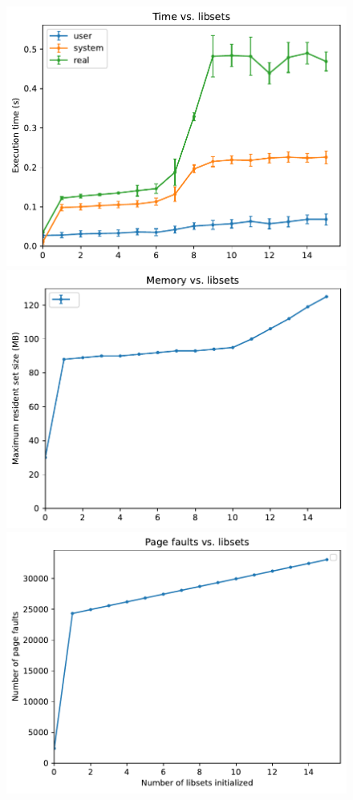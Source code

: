 \begin{figure}
	\begin{minipage}{0.5\textwidth}
	\includegraphics[width=\textwidth]{figs/dyno-baseline-times}
	\includegraphics[width=\textwidth]{figs/dyno-baseline-memory}
	\includegraphics[width=\textwidth]{figs/dyno-baseline-faults}

\end{minipage}
\end{figure}
